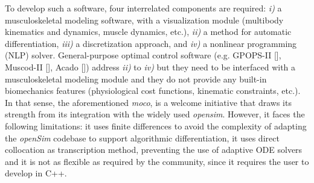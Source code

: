 To develop such a software, four interrelated components are required: \textit{i)} a musculoskeletal modeling software, with a visualization module (multibody kinematics and dynamics, muscle dynamics, etc.), \textit{ii)} a method for automatic differentiation, \textit{iii)} a discretization approach, and \textit{iv)} a nonlinear programming (NLP) solver. 
General-purpose optimal control software (e.g. GPOPS-II [\addref], Muscod-II [\addref], Acado [\addref]) address \textit{ii)} to \textit{iv)} but they need to be interfaced with a musculoskeletal modeling module and they do not provide any built-in biomechanics features (physiological cost functions, kinematic constraints, etc.). 
In that sense, the aforementioned \textit{moco}, is a welcome initiative that draws its strength from its integration with the widely used \textit{opensim}.
However, it faces the following limitations: it uses finite differences to avoid the complexity of adapting the \textit{openSim} codebase to support algorithmic differentiation, it uses direct collocation as transcription method, preventing the use of adaptive ODE solvers and it is not as flexible as required by the community, since it requires the user to develop in C++. 






